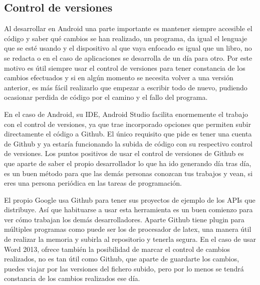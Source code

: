 \subsection{Control de versiones}
\label{subsecc:Control de versiones}

Al desarrollar en Android una parte importante es mantener siempre accesible el código y saber qué cambios se han realizado, un programa, da igual el lenguaje que se esté usando y el dispositivo al que vaya enfocado es igual que un libro, no se redacta o en el caso de aplicaciones se desarrolla de un día para otro. Por este motivo es útil siempre usar el control de versiones para tener constancia de los cambios efectuados y si en algún momento se necesita volver a una versión anterior, es más fácil realizarlo que empezar a escribir todo de nuevo, pudiendo ocasionar perdida de código por el camino y el fallo del programa.

En el caso de Android, su IDE, Android Studio facilita enormemente el trabajo con el control de versiones, ya que trae incorporado opciones que permiten subir directamente el código a Github. El único requisito que pide es tener una cuenta de Github y ya estaría funcionando la subida de código con su respectivo control de versiones.
Los puntos positivos de usar el control de versiones de Github es que aparte de saber el propio desarrollador lo que ha ido generando día tras día, es un buen método para que las demás personas conozcan tus trabajos y vean, si eres una persona periódica en las tareas de programación.

El propio Google usa Github para tener sus proyectos de ejemplo de los APIs que distribuye. Así que habituarse a usar esta herramienta es un buen comienzo para ver cómo trabajan los demás desarrolladores.
Aparte Github tiene plugin para múltiples programas como puede ser los de procesador de latex, una manera útil de realizar la memoria y subirla al repositorio y tenerla segura.
En el caso de usar Word 2013, ofrece también la posibilidad de marcar el control de cambios realizados, no es tan útil como Github, que aparte de guardarte los cambios, puedes viajar por las versiones del fichero subido, pero por lo menos se tendrá constancia de los cambios realizados ese día.

